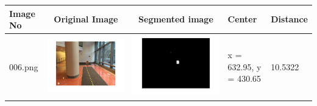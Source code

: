 \documentclass[fleqn,10pt]{SelfArx} %
\begin{document}
\begin{table}
\centering
\begin{tabular}{>{\centering\arraybackslash}M{15mm}cc>{\centering\arraybackslash}M{11mm}>{\centering\arraybackslash}M{15mm}}
\hline 
Image No & Original Image & Segmented image & Center & Distance \\ 
\hline 
\vspace{-4cm}006.png & \includegraphics[trim={3cm 2cm 3cm 2cm},clip,scale=0.28]{results/006.jpg} & \includegraphics[trim={3cm 2cm 3cm 2cm},clip,scale=0.28]{results/006s.jpg} & \vspace{-4cm} x = 632.95, y = 430.65 & \vspace{-4cm}10.5322 \\ 
\hline 

\end{tabular}
\end{table}
\end{document}
